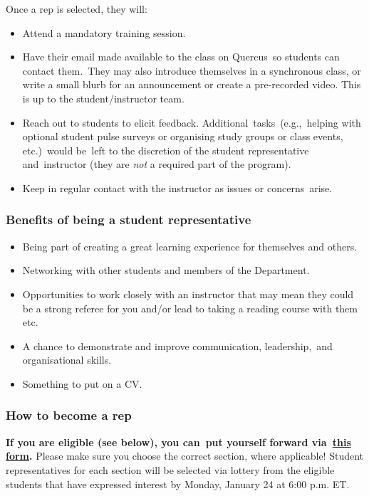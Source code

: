 \documentclass[
  openany]{book}
\begin{document}
Once a rep is selected, they will:

\begin{itemize}
\item
  Attend a mandatory training session.
\item
  Have their email made available to the class on Quercus~so students can contact them.~They may also introduce themselves in a synchronous class, or write a small blurb for an announcement or create a pre-recorded video. This is up to the student/instructor team.
\item
  Reach out to students to elicit feedback. Additional~tasks~(e.g.,~helping with optional student pulse surveys or organising study groups or class events, etc.)~would be~left to the discretion of the student representative and~instructor (they are \emph{not} a required part of the program).~~
\item
  Keep in regular contact with the instructor as issues or concerns~arise.
\end{itemize}

\hypertarget{benefits-of-being-a-student-representative}{%
\subsubsection{Benefits of being a student representative}\label{benefits-of-being-a-student-representative}}

\begin{itemize}
\item
  Being part of creating a great learning experience for themselves and others.
\item
  Networking with other students and members of the Department.
\item
  Opportunities to work closely with an instructor that may mean they could be a strong referee for you and/or lead to taking a reading course with them etc.
\item
  A chance to demonstrate and improve communication, leadership,~and organisational skills.
\item
  Something to put on a CV.
\end{itemize}

\hypertarget{how-to-become-a-rep}{%
\subsubsection{How to become a rep}\label{how-to-become-a-rep}}

\textbf{If you are eligible (see below), you can~put yourself forward via~\href{https://forms.office.com/r/3ZjP0TBpQd}{this form}.} Please make sure you choose the correct section, where applicable! Student representatives for each section will be selected via lottery from the eligible students that have expressed interest by Monday, January 24 at 6:00 p.m. ET.~~
\end{document}
